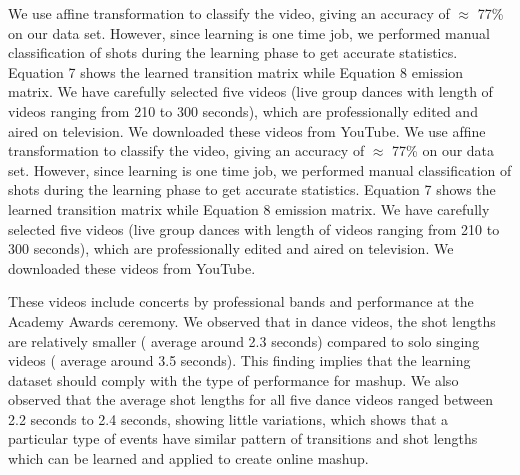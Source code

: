 \documentclass{sig-alternate}
\begin{document}
We use affine transformation to classify the video, giving an accuracy of \(\approx\) 77\% on our data set. However, since learning is one time job, we performed manual classiﬁcation of shots during the learning phase to get accurate statistics. Equation 7 shows the learned transition matrix while Equation 8 emission matrix. We have carefully selected ﬁve videos (live group dances with length of videos ranging from 210 to 300 seconds), which are professionally edited and aired on television. We downloaded these videos from YouTube. We use afﬁne transformation to classify the video, giving an accuracy of \(\approx\) 77\% on our data set. However, since learning is one time job, we performed manual classification of shots during the learning phase to get accurate statistics. Equation 7 shows the learned transition matrix while Equation 8 emission matrix. We have carefully selected five videos (live group dances with length of videos ranging from 210 to 300 seconds), which are professionally edited and aired on television. We downloaded these videos from YouTube. 

These videos include concerts by professional bands and performance at the Academy Awards ceremony. We observed that in dance videos, the shot lengths are relatively smaller ( average around 2.3 seconds) compared to solo singing videos ( average around 3.5 seconds). This ﬁnding implies that the learning dataset should comply with the type of performance for mashup. We also observed that the average shot lengths for all ﬁve dance videos ranged between 2.2 seconds to 2.4 seconds, showing little variations, which shows that a particular type of events have similar pattern of transitions and shot lengths which can be learned and applied to create online mashup.
\end{document}

